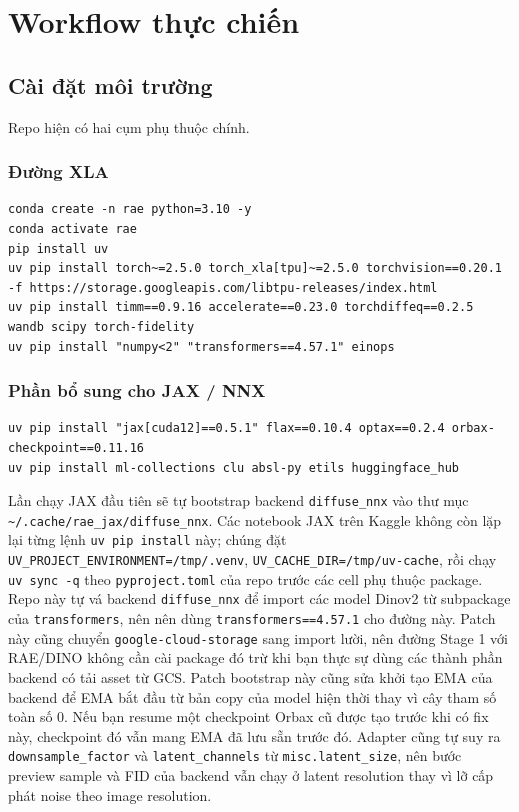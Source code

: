 \section{Workflow thực chiến}

\subsection{Cài đặt môi trường}

Repo hiện có hai cụm phụ thuộc chính.

\subsubsection{Đường XLA}

\begin{lstlisting}[style=rae]
conda create -n rae python=3.10 -y
conda activate rae
pip install uv
uv pip install torch~=2.5.0 torch_xla[tpu]~=2.5.0 torchvision==0.20.1 -f https://storage.googleapis.com/libtpu-releases/index.html
uv pip install timm==0.9.16 accelerate==0.23.0 torchdiffeq==0.2.5 wandb scipy torch-fidelity
uv pip install "numpy<2" "transformers==4.57.1" einops
\end{lstlisting}

\subsubsection{Phần bổ sung cho JAX / NNX}

\begin{lstlisting}[style=rae]
uv pip install "jax[cuda12]==0.5.1" flax==0.10.4 optax==0.2.4 orbax-checkpoint==0.11.16
uv pip install ml-collections clu absl-py etils huggingface_hub
\end{lstlisting}

Lần chạy JAX đầu tiên sẽ tự bootstrap backend \texttt{diffuse\_nnx} vào thư mục
\texttt{\~{}/.cache/rae\_jax/diffuse\_nnx}.
Các notebook JAX trên Kaggle không còn lặp lại từng lệnh \texttt{uv pip install}
này; chúng đặt \texttt{UV\_PROJECT\_ENVIRONMENT=/tmp/.venv},
\texttt{UV\_CACHE\_DIR=/tmp/uv-cache}, rồi chạy \texttt{uv sync -q} theo
\texttt{pyproject.toml} của repo trước các cell phụ thuộc package.
Repo này tự vá backend \texttt{diffuse\_nnx} để import các model Dinov2 từ
subpackage của \texttt{transformers}, nên nên dùng
\texttt{transformers==4.57.1} cho đường này.
Patch này cũng chuyển \texttt{google-cloud-storage} sang import lười, nên đường
Stage 1 với RAE/DINO không cần cài package đó trừ khi bạn thực sự dùng các
thành phần backend có tải asset từ GCS.
Patch bootstrap này cũng sửa khởi tạo EMA của backend để EMA bắt đầu từ bản
copy của model hiện thời thay vì cây tham số toàn số 0. Nếu bạn resume một
checkpoint Orbax cũ được tạo trước khi có fix này, checkpoint đó vẫn mang EMA
đã lưu sẵn trước đó.
Adapter cũng tự suy ra \texttt{downsample\_factor} và \texttt{latent\_channels}
từ \texttt{misc.latent\_size}, nên bước preview sample và FID của backend vẫn
chạy ở latent resolution thay vì lỡ cấp phát noise theo image resolution.

